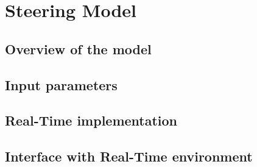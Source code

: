 \documentclass[ExampleMasters.tex]{subfiles}
\begin{document}
\clearpage
\chapter{Steering Model}


\section{Overview of the model}

			

\section{Input parameters}

\section{Real-Time implementation}

\section{Interface with Real-Time environment}
\end{document}
